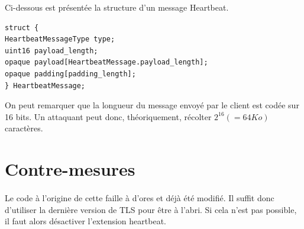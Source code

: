 Ci-dessous est présentée la structure d'un message Heartbeat.
\begin{verbatim}
struct {
HeartbeatMessageType type;
uint16 payload_length;
opaque payload[HeartbeatMessage.payload_length];
opaque padding[padding_length];
} HeartbeatMessage;
\end{verbatim}

On peut remarquer que la longueur du message envoyé par le client est codée sur 16 bits. Un attaquant peut donc, théoriquement, récolter $2^{16} (= 64Ko)$ caractères.

\section{Contre-mesures}
\paragraph{}
Le code à l'origine de cette faille à d'ores et déjà été modifié. Il suffit donc d'utiliser la dernière version de TLS pour être à l'abri. Si cela n'est pas possible, il faut alors désactiver l'extension heartbeat.
